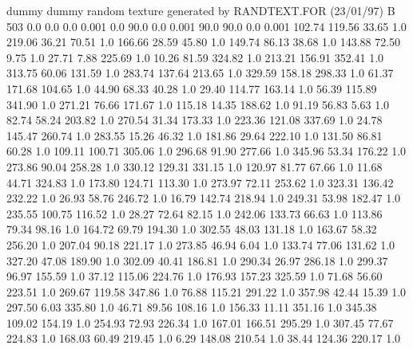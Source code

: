 dummy
dummy
random texture generated by RANDTEXT.FOR (23/01/97)
B   503
      0.0     0.0    0.0     0.001
      0.0    90.0    0.0     0.001
     90.0    90.0    0.0     0.001
    102.74    119.56     33.65  1.0
    219.06     36.21     70.51  1.0
    166.66     28.59     45.80  1.0
    149.74     86.13     38.68  1.0
    143.88     72.50      9.75  1.0
     27.71      7.88    225.69  1.0
     10.26     81.59    324.82  1.0
    213.21    156.91    352.41  1.0
    313.75     60.06    131.59  1.0
    283.74    137.64    213.65  1.0
    329.59    158.18    298.33  1.0
     61.37    171.68    104.65  1.0
     44.90     68.33     40.28  1.0
     29.40    114.77    163.14  1.0
     56.39    115.89    341.90  1.0
    271.21     76.66    171.67  1.0
    115.18     14.35    188.62  1.0
     91.19     56.83      5.63  1.0
     82.74     58.24    203.82  1.0
    270.54     31.34    173.33  1.0
    223.36    121.08    337.69  1.0
     24.78    145.47    260.74  1.0
    283.55     15.26     46.32  1.0
    181.86     29.64    222.10  1.0
    131.50     86.81     60.28  1.0
    109.11    100.71    305.06  1.0
    296.68     91.90    277.66  1.0
    345.96     53.34    176.22  1.0
    273.86     90.04    258.28  1.0
    330.12    129.31    331.15  1.0
    120.97     81.77     67.66  1.0
     11.68     44.71    324.83  1.0
    173.80    124.71    113.30  1.0
    273.97     72.11    253.62  1.0
    323.31    136.42    232.22  1.0
     26.93     58.76    246.72  1.0
     16.79    142.74    218.94  1.0
    249.31     53.98    182.47  1.0
    235.55    100.75    116.52  1.0
     28.27     72.64     82.15  1.0
    242.06    133.73     66.63  1.0
    113.86     79.34     98.16  1.0
    164.72     69.79    194.30  1.0
    302.55     48.03    131.18  1.0
    163.67     58.32    256.20  1.0
    207.04     90.18    221.17  1.0
    273.85     46.94      6.04  1.0
    133.74     77.06    131.62  1.0
    327.20     47.08    189.90  1.0
    302.09     40.41    186.81  1.0
    290.34     26.97    286.18  1.0
    299.37     96.97    155.59  1.0
     37.12    115.06    224.76  1.0
    176.93    157.23    325.59  1.0
     71.68     56.60    223.51  1.0
    269.67    119.58    347.86  1.0
     76.88    115.21    291.22  1.0
    357.98     42.44     15.39  1.0
    297.50      6.03    335.80  1.0
     46.71     89.56    108.16  1.0
    156.33     11.11    351.16  1.0
    345.38    109.02    154.19  1.0
    254.93     72.93    226.34  1.0
    167.01    166.51    295.29  1.0
    307.45     77.67    224.83  1.0
    168.03     60.49    219.45  1.0
      6.29    148.08    210.54  1.0
     38.44    124.36    220.17  1.0
